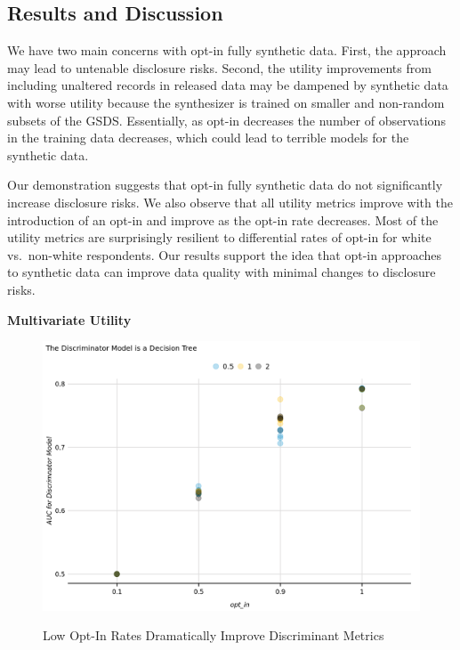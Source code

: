 \documentclass[
]{urban-formatting}
\begin{document}
\subsection{Results and Discussion}

We have two main concerns with opt-in fully synthetic data. First, the
approach may lead to untenable disclosure risks. Second, the utility
improvements from including unaltered records in released data may be
dampened by synthetic data with worse utility because the synthesizer is
trained on smaller and non-random subsets of the GSDS. Essentially, as
opt-in decreases the number of observations in the training data
decreases, which could lead to terrible models for the synthetic data.

Our demonstration suggests that opt-in fully synthetic data do not
significantly increase disclosure risks. We also observe that all
utility metrics improve with the introduction of an opt-in and improve
as the opt-in rate decreases. Most of the utility metrics are
surprisingly resilient to differential rates of opt-in for white
vs.~non-white respondents. Our results support the idea that opt-in
approaches to synthetic data can improve data quality with minimal
changes to disclosure risks.

\textbf{Multivariate Utility}

\begin{figure}[!htb]
    \caption{Low Opt-In Rates Dramatically Improve Discriminant Metrics}
    \centering
    \includegraphics[width=6.5in]{../analysis/figures/discriminator-auc-1.png}
    \label{fig:discriminator}
\end{figure}
\end{document}
